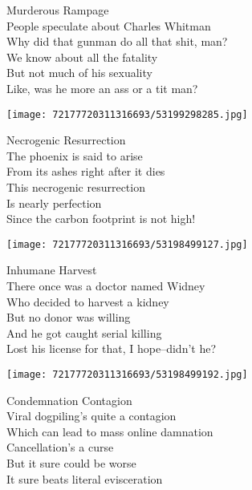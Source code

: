 \documentclass[10pt,letterpaper]{article}
\begin{document}
\begin{center}
Murderous Rampage\\
\vskip 0.2in
People speculate about Charles Whitman\\
Why did that gunman do all that shit, man?\\
We know about all the fatality\\
But not much of his sexuality\\
Like, was he more an ass or a tit man?\\
\end{center}
\pagebreak

\begin{center}
\texttt{[image: 72177720311316693/53199298285.jpg]}
\end{center}

\begin{center}
Necrogenic Resurrection\\
\vskip 0.2in
The phoenix is said to arise\\
From its ashes right after it dies\\
This necrogenic resurrection\\
Is nearly perfection\\
Since the carbon footprint is not high!\\
\end{center}
\pagebreak

\begin{center}\texttt{[image: 72177720311316693/53198499127.jpg]}
\end{center}
\begin{center}
Inhumane Harvest\\
\vskip 0.2in
There once was a doctor named Widney\\
Who decided to harvest a kidney\\
But no donor was willing\\
And he got caught serial killing\\
Lost his license for that, I hope--didn't he?\\
\end{center}

\pagebreak
\begin{center}
\texttt{[image: 72177720311316693/53198499192.jpg]}
\end{center}

\begin{center}
Condemnation Contagion\\
\vskip 0.2in
Viral dogpiling's quite a contagion\\
Which can lead to mass online damnation\\
Cancellation's a curse\\
But it sure could be worse\\
It sure beats literal evisceration\\
\end{center}
\pagebreak
\end{document}
